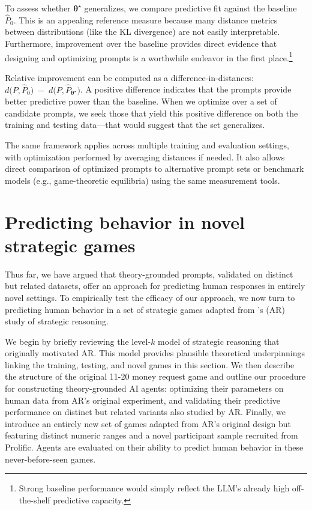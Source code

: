 \documentclass[11pt]{article}
\theoremstyle{definition}
\newcommand{\aisub}{AI agent}
\newcommand{\persona}{prompt}
\begin{document}
To assess whether $\bm{\theta^{\star}}$ generalizes, we compare predictive fit against the baseline $\hat P_0$.  
This is an appealing reference measure because many distance metrics between distributions (like the KL divergence) are not easily interpretable.
Furthermore, improvement over the baseline provides direct evidence that designing and optimizing \persona{s} is a worthwhile endeavor in the first place.\footnote{Strong baseline performance would simply reflect the LLM's already high off-the-shelf predictive capacity.}

Relative improvement can be computed as a difference-in-distances: $d\bigl(P, \hat P_{0}\bigr) \;-\; d\bigl(P, \hat P_{\bm{\theta^{\star}}}\bigr)$.
A positive difference indicates that the \persona{s} provide better predictive power than the baseline.
When we optimize over a set of candidate \persona{s}, we seek those that yield this positive difference on both the training and testing data---that would suggest that the set generalizes.

The same framework applies across multiple training and evaluation settings, with optimization performed by averaging distances if needed.  
It also allows direct comparison of optimized \persona{s} to alternative \persona{} sets or benchmark models (e.g., game-theoretic equilibria) using the same measurement tools.  

\section{Predicting behavior in novel strategic games}
\label{sec:predict_new_AR}

Thus far, we have argued that theory-grounded \persona{s}, validated on distinct but related datasets, offer an approach for predicting human responses in entirely novel settings.
To empirically test the efficacy of our approach, we now turn to predicting human behavior in a set of strategic games adapted from \cite{1120Arad2012}'s (AR) study of strategic reasoning.

We begin by briefly reviewing the level-$k$ model of strategic reasoning that originally motivated AR. 
This model provides plausible theoretical underpinnings linking the training, testing, and novel games in this section.
We then describe the structure of the original 11-20 money request game and outline our procedure for constructing theory-grounded \aisub{s}: optimizing their parameters on human data from AR's original experiment, and validating their predictive performance on distinct but related variants also studied by AR.
Finally, we introduce an entirely new set of games adapted from AR's original design but featuring distinct numeric ranges and a novel participant sample recruited from Prolific. 
Agents are evaluated on their ability to predict human behavior in these never-before-seen games. 
\end{document}
